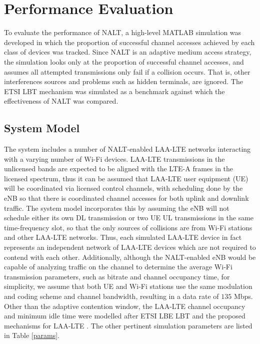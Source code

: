 \section{Performance Evaluation}\label{perf-eval}
To evaluate the performance of NALT, a high-level MATLAB simulation was developed in which the proportion of successful channel accesses achieved by each class of devices was tracked. Since NALT is an adaptive medium access strategy, the simulation looks only at the proportion of successful channel accesses, and assumes all attempted transmissions only fail if a collision occurs.  That is, other interferences sources and problems such as hidden terminals, are ignored.  The ETSI LBT mechanism was simulated as a benchmark against which the effectiveness of NALT was compared.


\subsection{System Model}
\label{sys-model}
The system includes a number of NALT-enabled \mbox{LAA-LTE} networks interacting with a varying number of \mbox{Wi-Fi} devices.  \mbox{LAA-LTE} transmissions in the unlicensed bands are expected to be aligned with the LTE-A frames in the licensed spectrum, thus it can be assumed that \mbox{\mbox{LAA-LTE}} user equipment (UE) will be coordinated via licensed control channels, with scheduling done by the eNB so that there is coordinated channel accesses for both uplink and downlink traffic.  The system model incorporates this by assuming the eNB will not schedule either its own DL transmission or two UE UL transmissions in the same time-frequency slot, so that the only sources of collisions are from \mbox{Wi-Fi} stations and other \mbox{LAA-LTE} networks. Thus, each simulated \mbox{LAA-LTE} device in fact represents an independent network of \mbox{LAA-LTE} devices which are not required to contend with each other. Additionally, although the NALT-enabled eNB would be capable of analyzing traffic on the channel to determine the average \mbox{Wi-Fi} transmission parameters, such as bitrate and channel occupancy time, for simplicity, we assume that both UE and \mbox{\mbox{Wi-Fi}} stations use the same modulation and coding scheme and channel bandwidth, resulting in a data rate of $135$ Mbps.  Other than the adaptive contention window, the \mbox{LAA-LTE} channel occupancy and minimum idle time were modelled after ETSI LBE LBT and the proposed mechanisms for \mbox{\mbox{LAA-LTE}} \cite{3gpp}.  The other pertinent simulation parameters are listed in Table \ref{params}.
